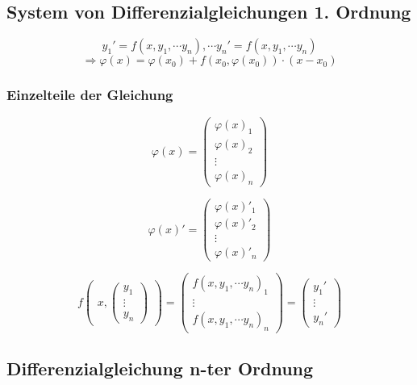 \subsection{System von Differenzialgleichungen 1. Ordnung}
\begin{equation}
    y_1' = f(x,y_1, \cdots y_n), \cdots y_n' = f(x,y_1, \cdots y_n)
\end{equation}
\begin{equation}
    \Rightarrow \varphi(x) = \varphi(x_0) + f(x_0, \varphi(x_0)) \cdot (x - x_0)
\end{equation}

\subsubsection{Einzelteile der Gleichung}
\begin{displaymath}
    \varphi(x) =
    \begin{pmatrix}
        \varphi(x)_1 \\
        \varphi(x)_2 \\
        \vdots \\
        \varphi(x)_n
    \end{pmatrix}
\end{displaymath}

\begin{displaymath}
    \varphi(x)' =
    \begin{pmatrix}
        \varphi(x)'_1 \\
        \varphi(x)'_2 \\
        \vdots \\
        \varphi(x)'_n
    \end{pmatrix}
\end{displaymath}

\begin{displaymath}
    f
    \begin{pmatrix}
        x,
        \begin{pmatrix}
            y_1 \\ \vdots \\ y_n
        \end{pmatrix}
    \end{pmatrix}
    =
    \begin{pmatrix}
        f(x, y_1, \cdots y_n)_1 \\
        \vdots \\
        f(x, y_1, \cdots y_n)_n
    \end{pmatrix}
    =
    \begin{pmatrix}
        y_1' \\
        \vdots \\
        y_n'
    \end{pmatrix}
\end{displaymath}

\subsection{Differenzialgleichung n-ter Ordnung}
